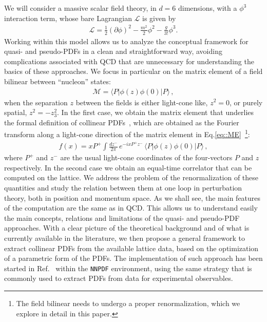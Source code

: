 We will consider a massive scalar field theory, in $d=6$ dimensions, with a
$\phi^3$ interaction term, whose bare Lagrangian $\mathcal{L}$ is given by
\begin{align}
    \label{eq:Lagrangian}
    \mathcal{L} = \frac{1}{2}\left(\partial\phi\right)^2 
    - \frac{m^2}{2} \phi^2 - \frac{g}{3!} \phi^3.
\end{align}
Working within this model allows us to analyze the conceptual framework for
quasi- and pseudo-PDFs in a clean and straightforward way, avoiding
complications associated with QCD that are unnecessary for understanding the
basics of these approaches. We focus in particular on the matrix element of a
field bilinear between ``nucleon'' states: 
\begin{align}
    \label{eq::ME}
    \mathcal{M} = 
    \langle P | \phi\left(z\right) \phi\left(0\right) | P \rangle\, ,
\end{align}
when the separation $z$ between the fields is either light-cone like, $z^2=0$,
or purely spatial, $z^2=-z_3^2$. In the first case, we obtain the matrix element
that underlies the formal definition of collinear PDFs~\cite{Collins:1980ui,
Collins:1981uw}, which are obtained as the Fourier transform along a light-cone
direction of the matrix element in Eq.\eqref{eq::ME}~\footnote{The field
bilinear needs to undergo a proper renormalization, which we explore in detail in
this paper. }:
\begin{align}
    \label{eq:barePDF}
    f(x) = xP^+ \int \frac{dz^-}{2\pi}\, e^{-i xP^+ z^-}\,
    \langle P | \phi\left(z\right) \phi\left(0\right) | P \rangle\, ,
\end{align}
where $P^+$ and $z^-$ are the usual light-cone coordinates of the four-vectors
$P$ and $z$ respectively. In the second case we obtain an equal-time correlator
that can be computed on the lattice. We address the problem of the
renormalization of these quantities and study the relation between them at one
loop in perturbation theory, both in position and momentum space. As we shall
see, the main features of the computation are the same as in QCD. This allows us
to understand easily the main concepts, relations and limitations of the quasi-
and pseudo-PDF approaches. With a clear picture of the theoretical background
and of what is currently available in the literature, we then propose a general
framework to extract collinear PDFs from the available lattice data, based on
the optimization of a parametric form of the PDFs. The implementation of such
approach has been started in Ref.~\cite{Cichy:2019ebf} within the {\tt NNPDF}
environment, using the same strategy that is commonly used to extract PDFs from
data for experimental observables.


